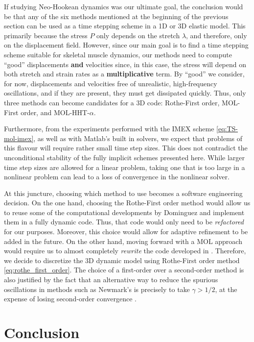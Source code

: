 \documentclass{sfuthesis}
\numberwithin{equation}{section}
\numberwithin{figure}{chapter}
\numberwithin{table}{chapter}
\theoremstyle{definition}
\begin{document}
If studying Neo-Hookean dynamics was our ultimate goal, the conclusion would be that any of the six methods mentioned at the beginning of the previous section can be used as a time stepping scheme in a 1D or 3D elastic model. This primarily because the stress $P$ only depends on the stretch $\lambda$, and therefore, only on the displacement field. However, since our main goal is to find a time stepping scheme suitable for skeletal muscle dynamics, our methods need to compute ``good'' displacements \textbf{and} velocities since, in this case, the stress will depend on both stretch and strain rates as a \textbf{multiplicative} term. By ``good'' we consider, for now, displacements and velocities free of unrealistic, high-frequency oscillations, and if they are present, they must get dissipated quickly. Thus, only three methods can become candidates for a 3D code: Rothe-First order, MOL-First order, and MOL-HHT-$\alpha$. 

Furthermore, from the experiments performed with the IMEX scheme \eqref{eq:TS-mol-imex}, as well as with Matlab's built in solvers, we expect that problems of this flavour will require rather small time step sizes. This does not contradict the unconditional stability of the fully implicit schemes presented here. While larger time step sizes are allowed for a linear problem, taking one that is too large in a nonlinear problem can lead to a loss of convergence in the nonlinear solver. 

At this juncture, choosing which method to use becomes a software engineering decision. On the one hand, choosing the Rothe-First order method would allow us to reuse some of the computational developments by Dominguez \cite{Seba} and implement them in a fully dynamic code. Thus, that code would only need to be \textit{refactored} for our purposes. Moreover, this choice would allow for adaptive refinement to be added in the future. On the other hand, moving forward with a MOL approach would require us to almost completely \textit{rewrite} the code developed in \cite{Seba}. Therefore, we decide to discretize the 3D dynamic model using Rothe-First order method \eqref{eq:rothe_first_order}. 
The choice of a first-order over a second-order method is also justified by the fact that an alternative way to reduce the spurious oscillations in methods such as Newmark's is precisely to take $\gamma > 1/2$, at the expense of losing second-order convergence \cite[Section 8.6]{raviartthomas}.

\section{Conclusion}
\end{document}
